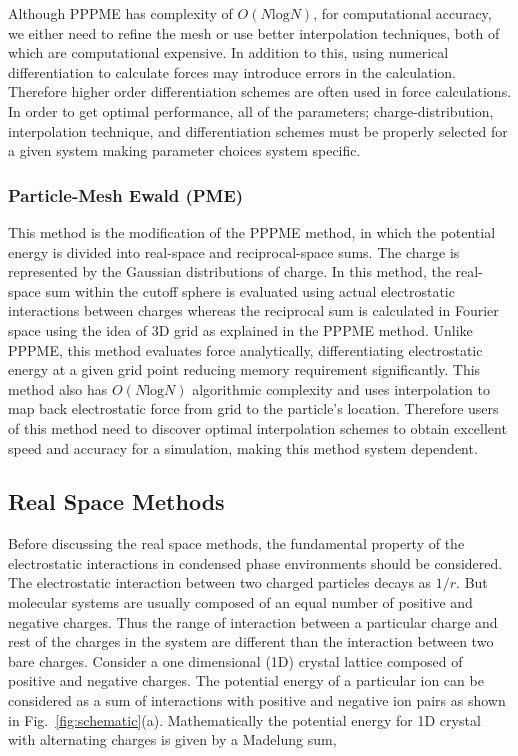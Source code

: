 Although PPPME has complexity of $O(N \mathrm{log}N)$, for computational accuracy, we either need to refine the mesh or use better interpolation techniques, both of which are computational expensive. In addition to this, using numerical differentiation to calculate forces may introduce errors in the calculation. Therefore higher order differentiation schemes are often used in force calculations. In order to get optimal performance, all of the parameters; charge-distribution, interpolation technique, and differentiation schemes must be properly selected for a given system making  parameter choices system specific. \cite{Toukmaji96}

\subsubsection{Particle-Mesh Ewald (PME)}
\label{subsubsec:PME}
This method is the modification of the PPPME method, in which the potential energy is divided into real-space and reciprocal-space sums. The charge is represented by the Gaussian distributions of charge. In this method, the real-space sum within the cutoff sphere is evaluated using actual electrostatic interactions between charges whereas the reciprocal sum is calculated in Fourier space using the idea of 3D grid as explained in the PPPME method. Unlike PPPME, this method evaluates force analytically, differentiating electrostatic energy at a given grid point reducing memory requirement significantly. This method also has $O(N\mathrm{log}N)$ algorithmic complexity and uses interpolation to map back electrostatic force from grid to the particle's location. Therefore users of this method need to discover optimal interpolation schemes to obtain excellent speed and accuracy for a simulation, making this method system dependent.

\subsection{Real Space Methods}
Before discussing the real space methods, the fundamental property of the electrostatic interactions in condensed phase environments should be considered. The electrostatic interaction between two charged particles decays as $1/r$. But molecular systems are usually composed of an equal number of positive and negative charges. Thus the range of interaction between a particular charge and rest of the charges in the system are different than the interaction between two bare charges. Consider a one dimensional (1D) crystal lattice composed of positive and negative charges. The potential energy of a particular ion can be considered as a sum of interactions with positive and negative ion pairs as shown in Fig.~\ref{fig:schematic}(a). Mathematically the potential energy for 1D crystal with alternating charges is given by a Madelung sum,


